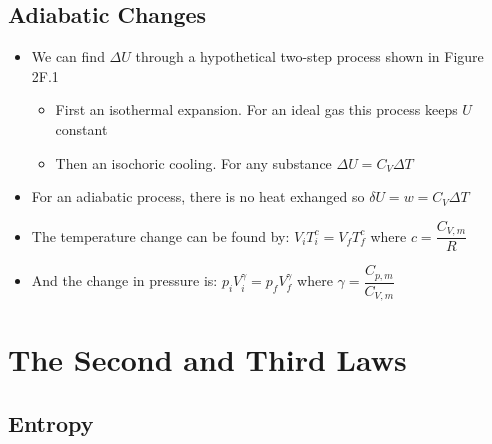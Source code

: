 \documentclass[12pt, openany, letterpaper]{memoir}
\begin{document}
\section{Adiabatic Changes}
\begin{itemize}
	\item We can find $\Delta U$ through a hypothetical two-step process shown in Figure 2F.1
	      \begin{itemize}
		      \item First an isothermal expansion. For an ideal gas this process keeps $U$ constant
		      \item Then an isochoric cooling. For any substance $\Delta U = C_V\Delta T$
	      \end{itemize}
	\item For an adiabatic process, there is no heat exhanged so $\delta U = w = C_V\Delta T$
	\item The temperature change can be found by: $V_iT_i^c = V_fT_f^c$ where $c=\dfrac{C_{V,m}}{R}$
	\item And the change in pressure is: $p_iV_i^\gamma=p_fV_f^\gamma$ where $\gamma = \dfrac{C_{p,m}}{C_{V,m}}$
\end{itemize}

\chapter{The Second and Third Laws}
\section{Entropy}
\end{document}
